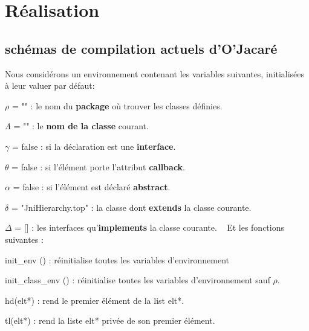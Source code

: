 \documentclass[a4paper, 11pt, notitlepage]{article}
\begin{document}


\section{Réalisation}

\subsection{schémas de compilation actuels d'O'Jacaré}

\noindent
Nous considérons un environnement contenant les  variables suivantes, initialisées à leur valuer par défaut: 

$\rho$ = "" : le nom du \textbf{package} où trouver les classes définies.

$\Lambda$ = "" : le \textbf{nom de la classe} courant.

$\gamma$ = false : si la déclaration est une \textbf{interface}.

$\theta$ = false : si l'élément porte l'attribut \textbf{callback}.

$\alpha$ = false : si l'élément est déclaré \textbf{abstract}.

$\delta$ = "JniHierarchy.top" : la classe dont \textbf{extends} la classe courante.

$\Delta$ = [] : les interfaces qu'\textbf{implements} la classe courante.
\ %
\newline
\noindent
Et les fonctions suivantes :

init\_env () : réinitialise toutes les variables d'environnement 

init\_class\_env () : réinitialise toutes les variables d'environnement sauf $\rho$.

hd(elt*) : rend le premier élément de la list elt*.

tl(elt*) : rend la liste elt* privée de son premier élément.
\end{document}
